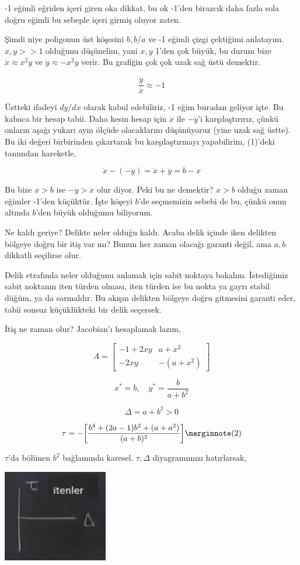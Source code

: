 \documentclass[12pt,fleqn]{article}\usepackage{../../common}
\begin{document}
-1 eğimli eğriden içeri giren oka dikkat, bu ok -1'den birazcık daha fazla sola
doğru eğimli bu sebeple içeri girmiş oluyor zaten.

Şimdi niye poligonun üst köşesini $b,b/a$ ve -1 eğimli çizgi çektiğimi
anlatayım. $x,y >> 1$ olduğunu düşünelim, yani $x,y$ 1'den çok büyük, bu durum
bize $\dot{x} \approx x^2y$ ve $\dot{y} \approx -x^2y$ verir. Bu grafiğin çok
çok uzak sağ üstü demektir.

$$ \frac{\dot{y}}{\dot{x}} \approx -1 $$

Üstteki ifadeyi $dy/dx$ olarak kabul edebiliriz, -1 eğim buradan geliyor
işte. Bu kabaca bir hesap tabii. Daha kesin hesap için $\dot{x}$ ile
$-\dot{y}$'i karşılaştırırız, çünkü onların aşağı yukarı aynı ölçüde
olacaklarını düşünüyoruz (yine uzak sağ üstte). Bu iki değeri birbirinden
çıkartarak bu karşılaştırmayı yapabilirim, (1)'deki tanımdan hareketle, 

$$ \dot{x} - (-\dot{y})  = \dot{x} + \dot{y} = b-x $$

Bu bize $x>b$ ise  $-\dot{y} > \dot{x}$ olur diyor. Peki bu ne demektir? $x>b$
olduğu zaman eğimler -1'den küçüktür. İşte köşeyi $b$'de seçmemizin sebebi de
bu, çünkü onun altında $b$'den büyük olduğumu biliyorum.

Ne kaldı geriye? Delikte neler olduğu kaldı. Acaba delik içinde iken delikten
bölgeye doğru bir itiş var mı? Bunun her zaman olacağı garanti değil, ama $a,b$
dikkatli seçilirse olur.

Delik etrafında neler olduğunu anlamak için sabit noktaya bakalım. İstediğimiz
sabit noktanın iten türden olması, iten türden ise bu nokta ya gayrı stabil
düğüm, ya da sarmaldır. Bu akışın delikten bölgeye doğru gitmesini garanti
eder, tabii sonsuz küçüklükteki bir delik seçersek.

İtiş ne zaman olur? Jacobian'ı hesaplamak lazım,

$$ 
A =
\left[\begin{array}{rr}
-1+2xy & a+x^2 \\ -2xy & -(a+x^2)
\end{array}\right]
$$

$$
x^{\ast} = b, \quad y^\ast = \frac{b}{a+b^2}
$$

$$ 
\Delta = a + b^2 > 0 
$$

$$ 
\tau = -\bigg[ \frac{b^4 + (2a-1)b^2 + (a+a^2) }{(a+b)^2} \bigg] 
\mlabel{2}
$$

$\tau$'da bölünen $b^2$ bağlamında karesel. $\tau,\Delta$ diyagramımızı
hatırlarsak,

\includegraphics[height=4cm]{09_17.png}
\end{document}
